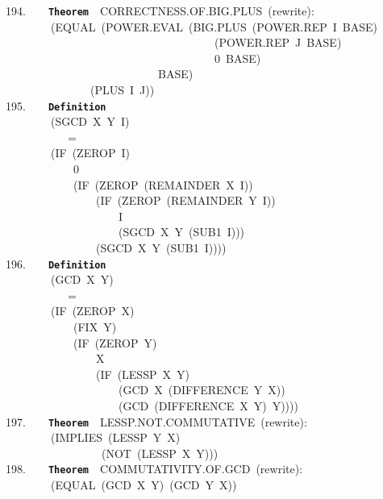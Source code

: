 \documentclass[11pt]{book}
\newenvironment{pubasis}{\begin{flushleft}\ttfamily\small}{\normalsize\rmfamily\end{flushleft}}
\newcommand{\axiomordefinition}[1]{\vspace{6pt}\texttt{\textbf{#1}}}
\begin{document}
\begin{pubasis}
194.~~~~\axiomordefinition{Theorem}~~CORRECT\-NESS.OF.BIG.PLUS~(rewrite):\\
~~~~~~~~(EQUAL~(POWER.EVAL~(BIG.PLUS~(POWER.REP~I~BASE)\\
~~~~~~~~~~~~~~~~~~~~~~~~~~~~~~~~~~~~~(POWER.REP~J~BASE)\\
~~~~~~~~~~~~~~~~~~~~~~~~~~~~~~~~~~~~~0~BASE)\\
~~~~~~~~~~~~~~~~~~~~~~~~~~~BASE)\\
~~~~~~~~~~~~~~~(PLUS~I~J))\\

195.~~~~\axiomordefinition{Definition}\\
~~~~~~~~(SGCD~X~Y~I)\\
~~~~~~~~~~~=\\
~~~~~~~~(IF~(ZEROP~I)\\
~~~~~~~~~~~~0\\
~~~~~~~~~~~~(IF~(ZEROP~(REMAINDER~X~I))\\
~~~~~~~~~~~~~~~~(IF~(ZEROP~(REMAINDER~Y~I))\\
~~~~~~~~~~~~~~~~~~~~I\\
~~~~~~~~~~~~~~~~~~~~(SGCD~X~Y~(SUB1~I)))\\
~~~~~~~~~~~~~~~~(SGCD~X~Y~(SUB1~I))))\\

196.~~~~\axiomordefinition{Definition}\\
~~~~~~~~(GCD~X~Y)\\
~~~~~~~~~~~=\\
~~~~~~~~(IF~(ZEROP~X)\\
~~~~~~~~~~~~(FIX~Y)\\
~~~~~~~~~~~~(IF~(ZEROP~Y)\\
~~~~~~~~~~~~~~~~X\\
~~~~~~~~~~~~~~~~(IF~(LESSP~X~Y)\\
~~~~~~~~~~~~~~~~~~~~(GCD~X~(DIFFERENCE~Y~X))\\
~~~~~~~~~~~~~~~~~~~~(GCD~(DIFFERENCE~X~Y)~Y))))\\

197.~~~~\axiomordefinition{Theorem}~~LESSP.NOT.COMMUTATIVE~(rewrite):\\
~~~~~~~~(IMPLIES~(LESSP~Y~X)\\
~~~~~~~~~~~~~~~~~(NOT~(LESSP~X~Y)))\\

198.~~~~\axiomordefinition{Theorem}~~COM\-MU\-TA\-TIV\-ITY.OF.GCD~(rewrite):\\
~~~~~~~~(EQUAL~(GCD~X~Y)~(GCD~Y~X))\\


\end{pubasis}
\end{document}
